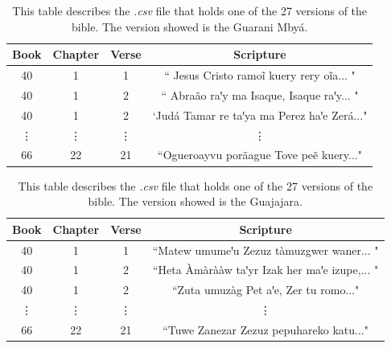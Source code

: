 \documentclass[runningheads]{llncs}
\begin{document}
    \begin{table}[ht!]
        \caption{This table describes the \textit{.csv}
            file that holds one of the 27 versions of the bible. The version showed is the Guarani Mbyá.}
        \begin{center}
            \begin{tabular}{|c|c|c|c|}
                \hline
                \textbf{Book} & \textbf{Chapter}& \textbf{Verse}& \textbf{Scripture} \\
                \hline
                40 & 1 & 1 & `` Jesus Cristo ramoĩ kuery rery oĩa... " \\
                \hline
                40 & 1 & 2 & `` Abraão raꞌy ma Isaque, Isaque raꞌy... " \\
                \hline
                40 & 1 & 2 &   `Judá Tamar re taꞌya ma Perez haꞌe Zerá..."  \\
                \hline
                \vdots & \vdots & \vdots & \vdots\\
                \hline
                66 & 22 & 21 & ``Ogueroayvu porãague Tove peẽ kuery..." \\
                \hline
            \end{tabular}
            \label{tab2}
        \end{center}
    \end{table}

    \begin{table}[ht!]
        \caption{This table describes the \textit{.csv}
            file that holds one of the 27 versions of the bible. The version showed is the Guajajara.}
        \begin{center}
            \begin{tabular}{|c|c|c|c|}
                \hline
                \textbf{Book} & \textbf{Chapter}& \textbf{Verse}& \textbf{Scripture} \\
                \hline
                40 & 1 & 1 & ``Matew umumeꞌu Zezuz tàmuzgwer waner... " \\
                \hline
                40 & 1 & 2 & ``Heta Àmàrààw taꞌyr Izak her maꞌe izupe,... " \\
                \hline
                40 & 1 & 2 &   ``Zuta umuzàg Pet aꞌe, Zer tu romo..."  \\
                \hline
                \vdots & \vdots & \vdots & \vdots\\
                \hline
                66 & 22 & 21 & ``Tuwe Zanezar Zezuz pepuhareko katu..." \\
                \hline
            \end{tabular}
            \label{tab3}
        \end{center}
    \end{table}
\end{document}

